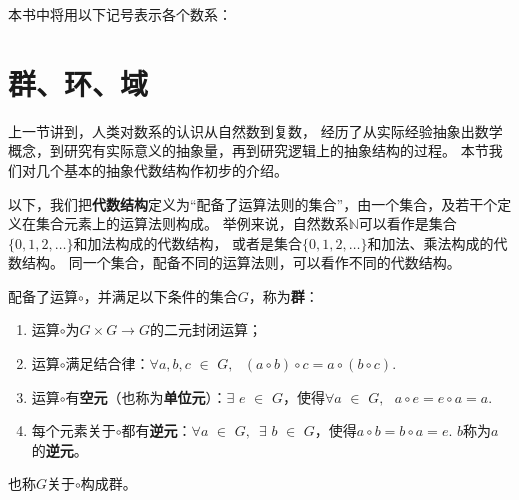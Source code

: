 \documentclass[12pt,UTF8]{ctexbook}
\begin{document}
\begin{appendix}
本书中将用以下记号表示各个数系：
\begin{center}
\end{center}

\section{群、环、域}

上一节讲到，人类对数系的认识从自然数到复数，
经历了从实际经验抽象出数学概念，到研究有实际意义的抽象量，再到研究逻辑上的抽象结构的过程。
本节我们对几个基本的抽象代数结构作初步的介绍。

以下，我们把\textbf{代数结构}定义为“配备了运算法则的集合”，由一个集合，及若干个定义在集合元素上的运算法则构成。
举例来说，自然数系$\mathbb{N}$可以看作是集合$\{0,1,2,\ldots\}$和加法构成的代数结构，
或者是集合$\{0,1,2,\ldots\}$和加法、乘法构成的代数结构。
同一个集合，配备不同的运算法则，可以看作不同的代数结构。

\begin{df}\label{df:0_1}
    配备了运算$\circ$，并满足以下条件的集合$G$，称为\textbf{群}：

    \begin{enumerate}
        \item 运算$\circ$为$G \times G \rightarrow G$的二元封闭运算；
        \item 运算$\circ$满足结合律：$\forall a, b, c\,\, \in\,\, G, \,\,\,\, (a\circ b) \circ c = a\circ (b \circ c).$
        \item 运算$\circ$有\textbf{空元}（也称为\textbf{单位元}）：$\exists \,\, e \,\, \in \,\, G$，使得$\forall a \,\, \in \,\, G, \,\,\,\, a \circ e = e \circ a = a. $
        \item 每个元素关于$\circ$都有\textbf{逆元}：$\forall a \,\, \in \,\, G, \,\,\, \exists \,\, b \,\, \in \,\, G$，使得$a \circ b = b \circ a = e.$ $b$称为$a$的\textbf{逆元}。
    \end{enumerate}
    也称$G$关于$\circ$构成群。
\end{df}


\end{appendix}
\end{document}
